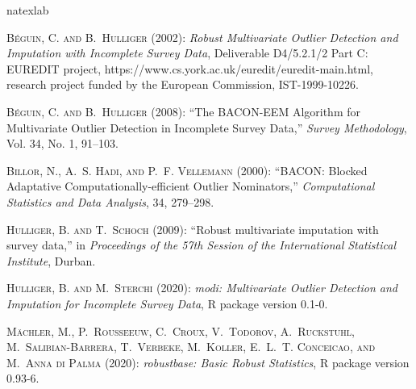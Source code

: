\documentclass[a4paper,oneside,11pt,DIV=12]{scrartcl}
\begin{document}
\clearpage
\singlespacing
\begin{thebibliography}{9}
\newcommand{\enquote}[1]{``#1''}
\expandafter\ifx\csname natexlab\endcsname\relax\def\natexlab#1{#1}\fi

\textsc{B{\'e}guin, C. and B.~Hulliger} (2002): \emph{Robust Multivariate
  Outlier Detection and Imputation with Incomplete Survey Data}, {D}eliverable
  D4/5.2.1/2 {P}art {C}: {EUREDIT} project,
  https://www.cs.york.ac.uk/euredit/euredit-main.html, research project funded
  by the {E}uropean {C}ommission, {IST}-1999-10226.

\textsc{B\'{e}guin, C. and B.~Hulliger} (2008): \enquote{The BACON-EEM
  Algorithm for Multivariate Outlier Detection in Incomplete Survey Data,}
  \emph{Survey Methodology}, Vol. 34, No. 1, 91--103.

\textsc{Billor, N., A.~S. Hadi, and P.~F. Vellemann} (2000): \enquote{{BACON}:
  Blocked Adaptative Computationally-efficient Outlier Nominators,}
  \emph{Computational Statistics and Data Analysis}, 34, 279--298.

\textsc{Hulliger, B. and T.~Schoch} (2009): \enquote{Robust multivariate
  imputation with survey data,} in \emph{Proceedings of the 57th Session of the
  International Statistical Institute}, Durban.

\textsc{Hulliger, B. and M.~Sterchi} (2020): \emph{modi: Multivariate Outlier
  Detection and Imputation for Incomplete Survey Data}, {R} package version
  0.1-0.

\textsc{M{\"a}chler, M., P.~Rousseeuw, C.~Croux, V.~Todorov, A.~Ruckstuhl,
  M.~Salibian-Barrera, T.~Verbeke, M.~Koller, E.~L.~T. Conceicao, and M.~{Anna
  di Palma}} (2020): \emph{robustbase: Basic Robust Statistics}, {R} package
  version 0.93-6.


\end{thebibliography}
\end{document}
